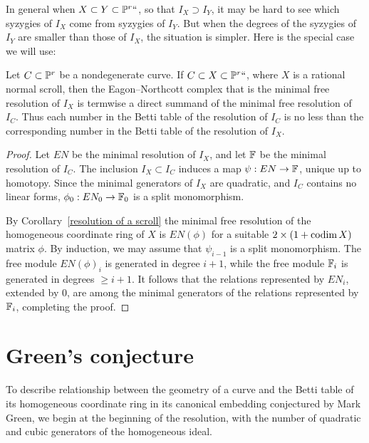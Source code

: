 In general when $X\subset Y\subset \PP^r` `$, so that $I_X \supset I_Y$,
it may be hard to see which syzygies of $I_X$ come
from syzygies of $I_Y$. But when the degrees of the syzygies of $I_Y$ are
smaller than those of $I_X$, the situation is simpler.
Here is the special case we will use:

\begin{proposition}\label{containment of resolutions}
Let $C\subset \PP^r$ be
a nondegenerate curve. If $C\subset X
\subset \PP^r` `$, where $X$ is a rational
%
normal scroll, then the Eagon--Northcott complex that is  the minimal
free resolution of $I_X$ is termwise a direct summand
of the minimal free resolution of $I_C$. Thus each number in the Betti table of the
%
resolution of $I_C$ is  
no less than
the corresponding number in the Betti table of the resolution of $I_X$.
\unif
\end{proposition}

\begin{proof}
Let $EN$ be the minimal resolution of $I_X$, and let $\FF$ be the minimal
resolution of $I_C$.
The inclusion $I_X \subset I_C$ induces a map $\psi: EN\to \FF$, unique
up to homotopy. Since the minimal generators of $I_X$ are quadratic,
and $I_C$ contains no linear forms, $\phi_0: EN_0\to \FF_0$ is a split
monomorphism.

By Corollary~\ref{resolution of a scroll} the minimal free resolution of the homogeneous
coordinate ring of $X$ is $EN(\phi)$ for a suitable $2\times (1+\codim X)$ matrix $\phi$.
By induction, we may assume that $\psi_{i-1}$ is a split monomorphism. The
free module $EN(\phi)_{i}$ is generated in
degree $i+1$, while the free module $\FF_i$ is generated in degrees
$\geq i+1$. It follows that the relations
represented by $EN_i$, extended by 0, are among the minimal generators
of the relations represented by $\FF_i$,
completing the proof.
\end{proof}

\section{Green's conjecture}
\label{Greenconj}

To describe relationship between the geometry of
a curve and the Betti table of its homogeneous coordinate ring
in its canonical embedding
conjectured by Mark Green,
%
 we 
begin
at the beginning of the resolution, with 
the number of quadratic and cubic generators of the homogeneous ideal.

